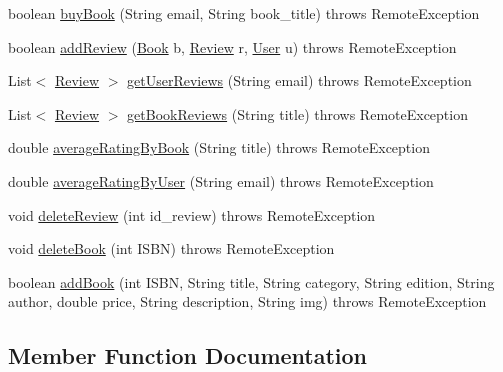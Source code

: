 \begin{DoxyCompactItemize}
\item 
boolean \hyperlink{interfaceserver_1_1remote_1_1_i_remote_a5ecb918e7d2650346770f3ff5676c25b}{buy\+Book} (String email, String book\+\_\+title)  throws Remote\+Exception
\item 
boolean \hyperlink{interfaceserver_1_1remote_1_1_i_remote_ab24486281e8c228ee82a48a5ca70297b}{add\+Review} (\hyperlink{classserver_1_1data_1_1_book}{Book} b, \hyperlink{classserver_1_1data_1_1_review}{Review} r, \hyperlink{classserver_1_1data_1_1_user}{User} u)  throws Remote\+Exception
\item 
List$<$ \hyperlink{classserver_1_1data_1_1_review}{Review} $>$ \hyperlink{interfaceserver_1_1remote_1_1_i_remote_a9e52d282ba2386018ebd6817459a743f}{get\+User\+Reviews} (String email)  throws Remote\+Exception
\item 
List$<$ \hyperlink{classserver_1_1data_1_1_review}{Review} $>$ \hyperlink{interfaceserver_1_1remote_1_1_i_remote_a600254593b70d9757190475d3435b390}{get\+Book\+Reviews} (String title)  throws Remote\+Exception
\item 
double \hyperlink{interfaceserver_1_1remote_1_1_i_remote_a4a53942c94debc835f1817b2753722de}{average\+Rating\+By\+Book} (String title)  throws Remote\+Exception
\item 
double \hyperlink{interfaceserver_1_1remote_1_1_i_remote_a11c915f0c22728be1898d46a78ac92cf}{average\+Rating\+By\+User} (String email)  throws Remote\+Exception
\item 
void \hyperlink{interfaceserver_1_1remote_1_1_i_remote_a2bcc3db515d7b6f420449bcf6367298c}{delete\+Review} (int id\+\_\+review)  throws Remote\+Exception
\item 
void \hyperlink{interfaceserver_1_1remote_1_1_i_remote_ac64967dff86a9c603d0c9eb815f222df}{delete\+Book} (int I\+S\+BN)  throws Remote\+Exception
\item 
boolean \hyperlink{interfaceserver_1_1remote_1_1_i_remote_aec137a7435ccced1aa7350b2fd2a1947}{add\+Book} (int I\+S\+BN, String title, String category, String edition, String author, double price, String description, String img)  throws Remote\+Exception
\end{DoxyCompactItemize}


\subsection{Member Function Documentation}
\mbox{\label{interfaceserver_1_1remote_1_1_i_remote_a3b11a0e182873e445ec8546394e36373}} 
